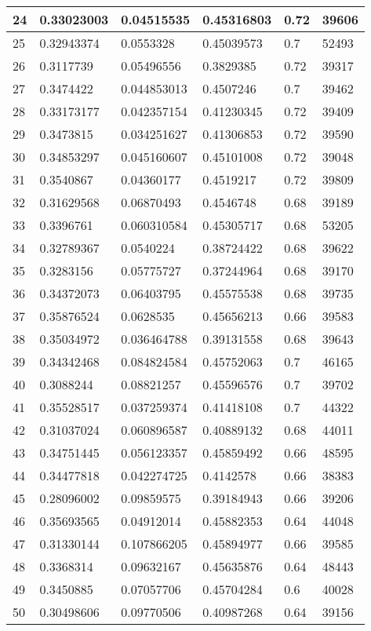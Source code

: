 \begin{longtable}{|l|l|l|l|l|l|}
24 & 0.33023003 & 0.04515535 & 0.45316803 & 0.72 & 39606 \\ \hline 
25 & 0.32943374 & 0.0553328 & 0.45039573 & 0.7 & 52493 \\ \hline 
26 & 0.3117739 & 0.05496556 & 0.3829385 & 0.72 & 39317 \\ \hline 
27 & 0.3474422 & 0.044853013 & 0.4507246 & 0.7 & 39462 \\ \hline 
28 & 0.33173177 & 0.042357154 & 0.41230345 & 0.72 & 39409 \\ \hline 
29 & 0.3473815 & 0.034251627 & 0.41306853 & 0.72 & 39590 \\ \hline 
30 & 0.34853297 & 0.045160607 & 0.45101008 & 0.72 & 39048 \\ \hline 
31 & 0.3540867 & 0.04360177 & 0.4519217 & 0.72 & 39809 \\ \hline 
32 & 0.31629568 & 0.06870493 & 0.4546748 & 0.68 & 39189 \\ \hline 
33 & 0.3396761 & 0.060310584 & 0.45305717 & 0.68 & 53205 \\ \hline 
34 & 0.32789367 & 0.0540224 & 0.38724422 & 0.68 & 39622 \\ \hline 
35 & 0.3283156 & 0.05775727 & 0.37244964 & 0.68 & 39170 \\ \hline 
36 & 0.34372073 & 0.06403795 & 0.45575538 & 0.68 & 39735 \\ \hline 
37 & 0.35876524 & 0.0628535 & 0.45656213 & 0.66 & 39583 \\ \hline 
38 & 0.35034972 & 0.036464788 & 0.39131558 & 0.68 & 39643 \\ \hline 
39 & 0.34342468 & 0.084824584 & 0.45752063 & 0.7 & 46165 \\ \hline 
40 & 0.3088244 & 0.08821257 & 0.45596576 & 0.7 & 39702 \\ \hline 
41 & 0.35528517 & 0.037259374 & 0.41418108 & 0.7 & 44322 \\ \hline 
42 & 0.31037024 & 0.060896587 & 0.40889132 & 0.68 & 44011 \\ \hline 
43 & 0.34751445 & 0.056123357 & 0.45859492 & 0.66 & 48595 \\ \hline 
44 & 0.34477818 & 0.042274725 & 0.4142578 & 0.66 & 38383 \\ \hline 
45 & 0.28096002 & 0.09859575 & 0.39184943 & 0.66 & 39206 \\ \hline 
46 & 0.35693565 & 0.04912014 & 0.45882353 & 0.64 & 44048 \\ \hline 
47 & 0.31330144 & 0.107866205 & 0.45894977 & 0.66 & 39585 \\ \hline 
48 & 0.3368314 & 0.09632167 & 0.45635876 & 0.64 & 48443 \\ \hline 
49 & 0.3450885 & 0.07057706 & 0.45704284 & 0.6 & 40028 \\ \hline 
50 & 0.30498606 & 0.09770506 & 0.40987268 & 0.64 & 39156 \\ \hline 
\end{longtable}